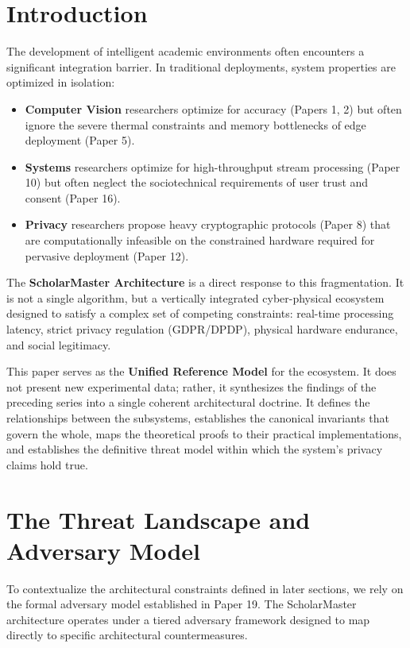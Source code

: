 \documentclass[conference]{IEEEtran}
\begin{document}
\section{Introduction}
The development of intelligent academic environments often encounters a significant integration barrier. In traditional deployments, system properties are optimized in isolation:
\begin{itemize}
    \item \textbf{Computer Vision} researchers optimize for accuracy (Papers 1, 2) but often ignore the severe thermal constraints and memory bottlenecks of edge deployment (Paper 5).
    \item \textbf{Systems} researchers optimize for high-throughput stream processing (Paper 10) but often neglect the sociotechnical requirements of user trust and consent (Paper 16).
    \item \textbf{Privacy} researchers propose heavy cryptographic protocols (Paper 8) that are computationally infeasible on the constrained hardware required for pervasive deployment (Paper 12).
\end{itemize}

The \textbf{ScholarMaster Architecture} is a direct response to this fragmentation. It is not a single algorithm, but a vertically integrated cyber-physical ecosystem designed to satisfy a complex set of competing constraints: real-time processing latency, strict privacy regulation (GDPR/DPDP), physical hardware endurance, and social legitimacy. 

This paper serves as the \textbf{Unified Reference Model} for the ecosystem. It does not present new experimental data; rather, it synthesizes the findings of the preceding series into a single coherent architectural doctrine. It defines the relationships between the subsystems, establishes the canonical invariants that govern the whole, maps the theoretical proofs to their practical implementations, and establishes the definitive threat model within which the system's privacy claims hold true.

\section{The Threat Landscape and Adversary Model}
To contextualize the architectural constraints defined in later sections, we rely on the formal adversary model established in Paper 19. The ScholarMaster architecture operates under a tiered adversary framework designed to map directly to specific architectural countermeasures.
\end{document}
